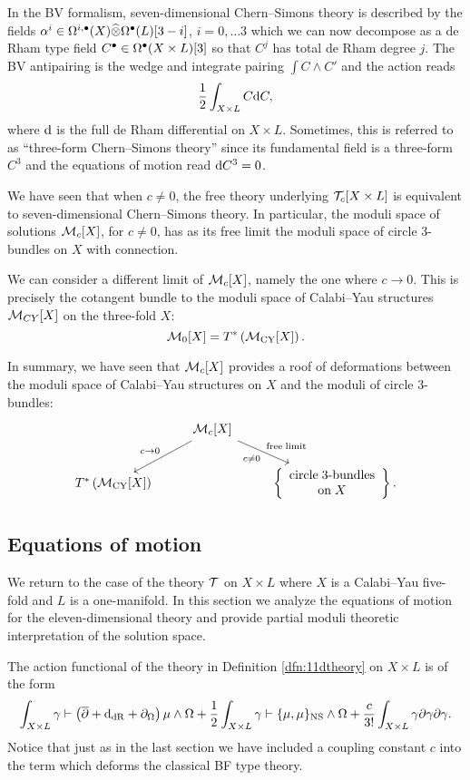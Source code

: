 \documentclass[11pt]{amsart}
\begin{document}
In the BV formalism, seven-dimensional Chern--Simons theory is described by the fields $\alpha^i \in \Omega^{i,\bullet}(X) \widehat{\otimes} \Omega^\bullet(L)[3-i]$, $i=0, \ldots 3$ which we can now decompose as a de Rham type field $C^\bullet \in \Omega^\bullet(X \times L)[3]$ so that $C^j$ has total de Rham degree $j$.
The BV antipairing is the wedge and integrate pairing $\int C \wedge C'$ and the action reads
\[
  \frac{1}{2} \int_{X \times L} C {\rm d} C,
\]
where ${\rm d}$ is the full de Rham differential on $X \times L$.
Sometimes, this is referred to as ``three-form Chern--Simons theory'' since its fundamental field is a three-form $C^3$ and the equations of motion read ${\rm d} C^3 = 0$.

We have seen that when $c \ne 0$, the free theory underlying $\mathcal T_c[X \times L]$ is equivalent to seven-dimensional Chern--Simons theory.
In particular, the moduli space of solutions $\mathcal M_c[X]$, for $c \ne 0$, has as its free limit the moduli space of circle $3$-bundles on $X$ with connection.

We can consider a different limit of $\mathcal M_c[X]$, namely the one where $c \to 0$.
This is precisely the cotangent bundle to the moduli space of Calabi--Yau structures $\mathcal M_{CY}[X]$ on the three-fold $X$:
\[
  \mathcal M_0[X] = T^* \left(\mathcal M_{\rm CY} [X]\right) .
\]

In summary, we have seen that $\mathcal M_c[X]$ provides a roof of deformations between the moduli space of Calabi--Yau structures on $X$ and the moduli of circle $3$-bundles:
\[
  \begin{tikzcd}
    & \cM_c[X] \ar[dr, "c \ne 0"', "{\rm free\;limit}"] \ar[dl, "c \to 0"'] & \\ T^* \left(\cM_{\rm CY} [X] \right) & & \left\{ \begin{array}{ccc} \mbox{circle\;3-bundles} \\ {\rm on} \; X \end{array} \right\} .
  \end{tikzcd}
\]


\subsection{Equations of motion}
\label{sec:org2973a4d}
We return to the case of the theory $\mathcal T$ on $X\times L$ where $X$ is a Calabi--Yau five-fold and $L$ is a one-manifold.
In this section we analyze the equations of motion for the eleven-dimensional theory and provide partial moduli theoretic interpretation of the solution space.

The action functional of the theory in Definition \ref{dfn:11dtheory} on $X \times L$ is of the form
\[
  \int_{X \times L} \gamma \vdash \left(\overline{\partial} + {\rm d}_{\rm dR} + \partial_{\Omega}\right) \mu \wedge \Omega + \frac12 \int_{X \times L} \gamma \vdash \{\mu,\mu\}_{\rm NS} \wedge \Omega + \frac{c}{3!} \int_{X \times L} \gamma \partial \gamma \partial \gamma .
\]
Notice that just as in the last section we have included a coupling constant $c$ into the term which deforms the classical BF type theory.
\end{document}
